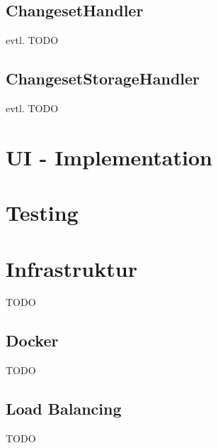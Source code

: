 \subsection{ChangesetHandler}
evtl. TODO
\subsection{ChangesetStorageHandler}
evtl. TODO
\section{UI - Implementation}
\section{Testing}
\section{Infrastruktur}
TODO
\subsection{Docker}
TODO
\subsection{Load Balancing}
TODO